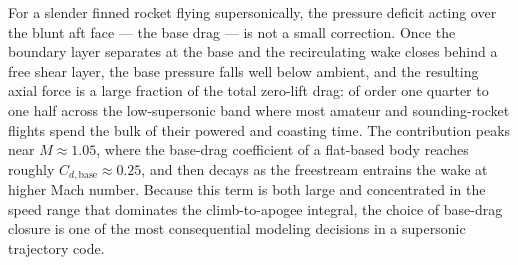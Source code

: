 
For a slender finned rocket flying supersonically, the pressure deficit acting
over the blunt aft face --- the base drag --- is not a small correction. Once
the boundary layer separates at the base and the recirculating wake closes
behind a free shear layer, the base pressure falls well below ambient, and the
resulting axial force is a large fraction of the total zero-lift drag: of order
one quarter to one half across the low-supersonic band where most amateur and
sounding-rocket flights spend the bulk of their powered and coasting time. The
contribution peaks near $M \approx 1.05$, where the base-drag coefficient of a
flat-based body reaches roughly $C_{d,\text{base}} \approx 0.25$, and then
decays as the freestream entrains the wake at higher Mach number. Because this
term is both large and concentrated in the speed range that dominates the
climb-to-apogee integral, the choice of base-drag closure is one of the most
consequential modeling decisions in a supersonic trajectory code.

